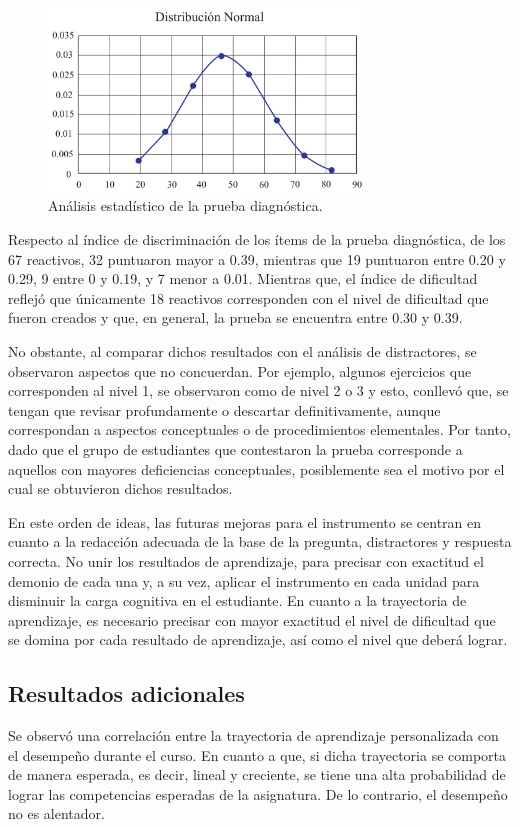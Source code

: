 \documentclass[spanish]{textolivre}
\begin{document}
\begin{figure}[h!]
   \centering
   \includegraphics[width=0.75\textwidth]{fig-11.pdf}
   \caption{Análisis estadístico de la prueba diagnóstica.}
   \label{fig:11}
\end{figure} %

Respecto al índice de discriminación de los ítems de la prueba diagnóstica, de los 67 reactivos, 32 puntuaron mayor a 0.39, mientras que 19 puntuaron entre 0.20 y 0.29, 9 entre 0 y 0.19, y 7 menor a 0.01. Mientras que, el índice de dificultad reflejó que únicamente 18 reactivos corresponden con el nivel de dificultad que fueron creados y que, en general, la prueba se encuentra entre 0.30 y 0.39.  

No obstante, al comparar dichos resultados con el análisis de distractores, se observaron aspectos que no concuerdan. Por ejemplo, algunos ejercicios que corresponden al nivel 1, se observaron como de nivel 2 o 3 y esto, conllevó que, se tengan que revisar profundamente o descartar definitivamente, aunque correspondan a aspectos conceptuales o de procedimientos elementales. Por tanto, dado que el grupo de estudiantes que contestaron la prueba corresponde a aquellos con mayores deficiencias conceptuales, posiblemente sea el motivo por el cual se obtuvieron dichos resultados.

En este orden de ideas, las futuras mejoras para el instrumento se centran en cuanto a la redacción adecuada de la base de la pregunta, distractores y respuesta correcta. No unir los resultados de aprendizaje, para precisar con exactitud el demonio de cada una y, a su vez, aplicar el instrumento en cada unidad para disminuir la carga cognitiva en el estudiante. En cuanto a la trayectoria de aprendizaje, es necesario precisar con mayor exactitud el nivel de dificultad que se domina por cada resultado de aprendizaje, así como el nivel que deberá lograr. 

\subsection{Resultados adicionales}\label{sec-autores}
Se observó una correlación entre la trayectoria de aprendizaje personalizada con el desempeño durante el curso. En cuanto a que, si dicha trayectoria se comporta de manera esperada, es decir, lineal y creciente, se tiene una alta probabilidad de lograr las competencias esperadas de la asignatura. De lo contrario, el desempeño no es alentador. 
\end{document}
